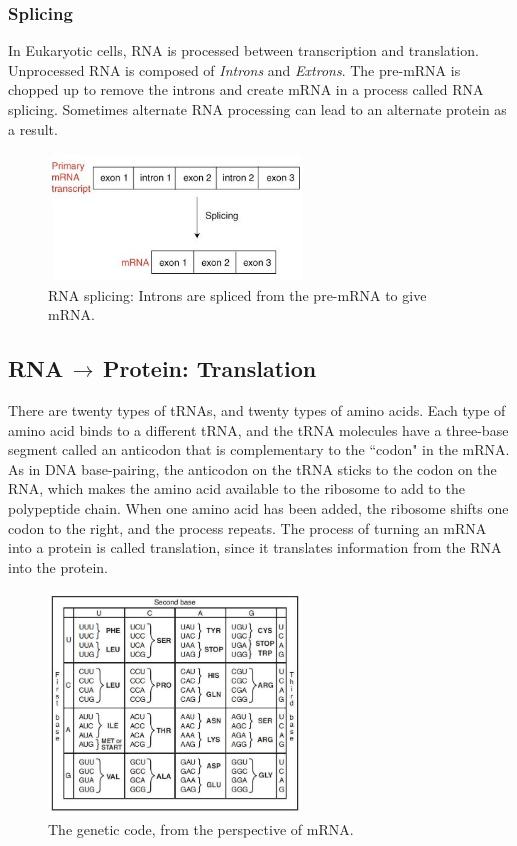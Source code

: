 \subsubsection{Splicing}
In Eukaryotic cells, RNA is processed between transcription and translation. Unprocessed RNA is composed of \textit{Introns} and \textit{Extrons}. The pre-mRNA is chopped up to remove the introns and create mRNA in a process called RNA splicing. Sometimes alternate RNA processing can lead to an alternate protein as a result. 
\begin{figure}[!tb]
	\centering
	\includegraphics[width=0.6\textwidth]{figures/splicing}
	\caption{RNA splicing: Introns are spliced from the pre-mRNA to give mRNA.}
	\label{fig:splicing}
\end{figure}

\subsection{RNA$\,\to\,$Protein: Translation}
There are twenty types of tRNAs, and twenty types of amino acids.
Each type of amino acid binds to a different tRNA, and the tRNA molecules
have a three-base segment called an anticodon that is complementary to the
``codon" in the mRNA. As in DNA base-pairing, the anticodon on the tRNA
sticks to the codon on the RNA, which makes the amino acid available to the
ribosome to add to the polypeptide chain. When one amino acid has been
added, the ribosome shifts one codon to the right, and the process repeats.
The process of turning an mRNA into a protein is called translation, since it
translates information from the RNA into the protein. 

\begin{figure}[!tb]
	\centering
	\includegraphics[width=0.6\textwidth]{figures/codon}
	\caption{The genetic code, from the perspective of mRNA.}
	\label{fig:codon}
\end{figure}


